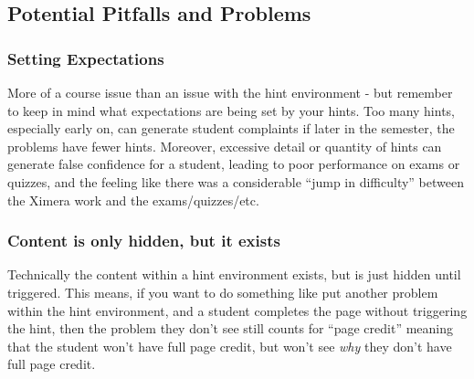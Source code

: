 \documentclass{ximera}
\begin{document}
    \subsection*{Potential Pitfalls and Problems}
        
        \subsubsection*{Setting Expectations}
            More of a course issue than an issue with the hint environment - but remember to keep in mind what expectations are being set by your hints. Too many hints, especially early on, can generate student complaints if later in the semester, the problems have fewer hints. Moreover, excessive detail or quantity of hints can generate false confidence for a student, leading to poor performance on exams or quizzes, and the feeling like there was a considerable ``jump in difficulty'' between the Ximera work and the exams/quizzes/etc.
            
            
        \subsubsection*{Content is only hidden, but it exists}
            Technically the content within a hint environment exists, but is just hidden until triggered. This means, if you want to do something like put another problem within the hint environment, and a student completes the page without triggering the hint, then the problem they don't see still counts for ``page credit'' meaning that the student won't have full page credit, but won't see \textit{why} they don't have full page credit.
            
\end{document}
